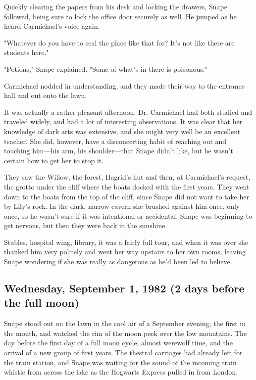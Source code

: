 Quickly clearing the papers from his desk and locking the drawers, Snape followed, being sure to lock the office door securely as well. He jumped as he heard Carmichael's voice again.

"Whatever do you have to seal the place like that for? It's not like there are students here."

"Potions," Snape explained. "Some of what's in there is poisonous."

Carmichael nodded in understanding, and they made their way to the entrance hall and out onto the lawn.

It was actually a rather pleasant afternoon. Dr. Carmichael had both studied and traveled widely, and had a lot of interesting observations. It was clear that her knowledge of dark arts was extensive, and she might very well be an excellent teacher. She did, however, have a disconcerting habit of reaching out and touching him—his arm, his shoulder—that Snape didn't like, but he wasn't certain how to get her to stop it.

They saw the Willow, the forest, Hagrid's hut and then, at Carmichael's request, the grotto under the cliff where the boats docked with the first years. They went down to the boats from the top of the cliff, since Snape did not want to take her by Lily's rock. In the dark, narrow cavern she brushed against him once, only once, so he wasn't sure if it was intentional or accidental. Snape was beginning to get nervous, but then they were back in the sunshine.

Stables, hospital wing, library, it was a fairly full tour, and when it was over she thanked him very politely and went her way upstairs to her own rooms, leaving Snape wondering if she was really as dangerous as he'd been led to believe.

\subsection{Wednesday, September 1, 1982 (2 days before the full moon)}

Snape stood out on the lawn in the cool air of a September evening, the first in the month, and watched the rim of the moon peek over the low mountains. The day before the first day of a full moon cycle, almost werewolf time, and the arrival of a new group of first years. The thestral carriages had already left for the train station, and Snape was waiting for the sound of the incoming train whistle from across the lake as the Hogwarts Express pulled in from London.


